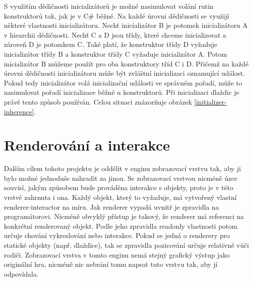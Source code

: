 S využitím dědičnosti inicializátorů je možné nasimulovat volání rutin konstruktorů tak, jak je v C\#  běžné. Na každé úrovni dědičnosti
se využijí některé vlastnosti inicializátoru. Nechť inicializátor B
je potomek inicializátoru A v hiearchii dědičnosti. Nechť C a D jsou třídy, které chceme inicializovat a zároveň D je potomkem C.
Také platí, že konstruktor třídy D vyžaduje inicializátor třídy B a konstruktor třídy C vyžaduje inicializátor A. Potom inicializátor B můžeme
použít pro oba konstruktory tříd C i D. Přičemž na každé úrovni dědičnosti inicializátoru může být zvláštní inicializaci oznamující událost.
Pokud tedy inicializátor volá inicializační události ve správném pořadí, může to nasimulovat pořadí inicializace běžné u konstruktorů.
Při inicializaci dlaždic je právě tento způsob používán. Celou situaci znázorňuje obrázek \ref{initializer-inherence}.


\section{Renderování a interakce}\label{renderer-interactor}

Dalším cílem tohoto projektu je oddělit v enginu zobrazovací vrstvu tak, aby ji bylo možné jednoduše nahradit za jinou.
Se zobrazovací vrstvou nicméně úzce souvisí, jakým způsobem bude prováděna interakce s objekty, proto je v této vrstvě zahrnuta i ona. 
Každý objekt, který to vyžaduje, má vytvořený vlastní renderer-interactor na míru. Jak renderer vypadá uvnitř je zpravidla na programátorovi. 
Nicméně obvyklý přístup je takový, že renderer má referenci na konkrétní renderovaný objekt. Podle jeho zpravidla readonly vlastnosti potom určuje
chování vykreslování nebo interakce. Pokud se jedná o renderery pro statické objekty (např. dlaždice), tak se zpravidla pozicování určuje relativně
vůči rodiči. Zobrazovací vrstva v tomto enginu nemá stejný grafický výstup jako originální hra, nicméně nic nebrání tomu napsat 
 tuto vrstvu tak, aby jí odpovídala.
